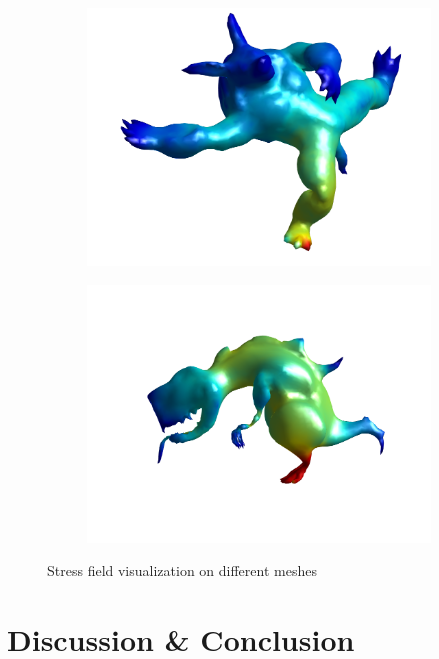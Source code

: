 \documentclass[11pt,titlepage]{article}
\begin{document}
\begin{figure}[!htbp]
\begin{center}
        \quad
        \begin{subfigure}[b]{0.45\textwidth}
            \centering
            \includegraphics[width=\textwidth]{tet/resized/armadillo_1}
        \end{subfigure}
        \begin{subfigure}[b]{0.45\textwidth}
            \centering
            \includegraphics[width=\textwidth]{tet/resized/dinosaur_1}
        \end{subfigure}
        \caption{\label{fig:7} Stress field visualization on different meshes}
    \end{center}
\end{figure}


\section{Discussion \& Conclusion}
\end{document}
